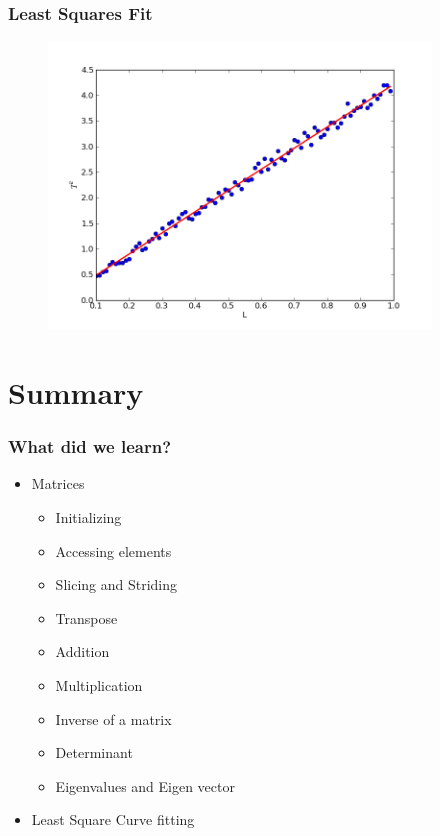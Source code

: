\documentclass[14pt,compress]{beamer}
\begin{document}
\begin{frame}[fragile]
\frametitle{Least Squares Fit}
\vspace{-0.15in}
\begin{figure}
\includegraphics[width=4in]{data/least-sq-fit}
\end{figure}
\end{frame}

\section{Summary}
\begin{frame}
  \frametitle{What did we learn?}
  \begin{itemize}
  \item Matrices
    \begin{itemize}
      \item Initializing
      \item Accessing elements
      \item Slicing and Striding
      \item Transpose
      \item Addition
      \item Multiplication
      \item Inverse of a matrix
      \item Determinant
      \item Eigenvalues and Eigen vector
    \end{itemize}
  \item Least Square Curve fitting
  \end{itemize}
\end{frame}
\end{document}
